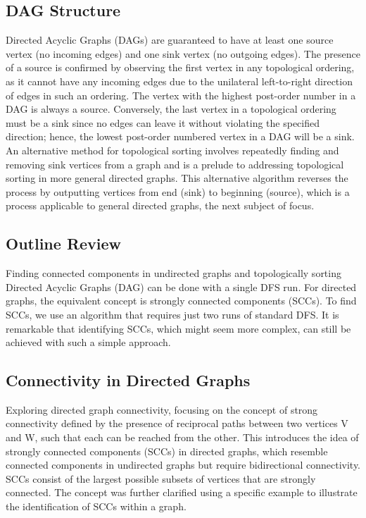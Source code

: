 \subsection*{DAG Structure}
Directed Acyclic Graphs (DAGs) are guaranteed to have at least one source vertex (no incoming edges) and one sink vertex (no outgoing edges).
The presence of a source is confirmed by observing the first vertex in any topological ordering, as it cannot have any incoming edges due to the unilateral left-to-right direction of edges in such an ordering.
The vertex with the highest post-order number in a DAG is always a source.
Conversely, the last vertex in a topological ordering must be a sink since no edges can leave it without violating the specified direction; hence, the lowest post-order numbered vertex in a DAG will be a sink.
An alternative method for topological sorting involves repeatedly finding and removing sink vertices from a graph and is a prelude to addressing topological sorting in more general directed graphs.
This alternative algorithm reverses the process by outputting vertices from end (sink) to beginning (source), which is a process applicable to general directed graphs, the next subject of focus.

\subsection*{Outline Review}
Finding connected components in undirected graphs and topologically sorting Directed Acyclic Graphs (DAG) can be done with a single DFS run.
For directed graphs, the equivalent concept is strongly connected components (SCCs).
To find SCCs, we use an algorithm that requires just two runs of standard DFS\@.
It is remarkable that identifying SCCs, which might seem more complex, can still be achieved with such a simple approach.

\subsection*{Connectivity in Directed Graphs}
Exploring directed graph connectivity, focusing on the concept of strong connectivity defined by the presence of reciprocal paths between two vertices V and W, such that each can be reached from the other.
This introduces the idea of strongly connected components (SCCs) in directed graphs, which resemble connected components in undirected graphs but require bidirectional connectivity.
SCCs consist of the largest possible subsets of vertices that are strongly connected.
The concept was further clarified using a specific example to illustrate the identification of SCCs within a graph.

